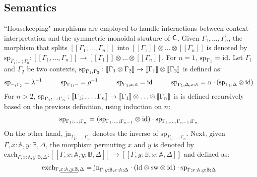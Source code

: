 \subsection{Semantics}

``Housekeeping" morphisms are employed to handle interactions between context interpretation and the symmetric monoidal struture of $\mathsf{C}$. Given $\Gamma_{1}, \ldots, \Gamma_{n}$, the morphism that splits $[\![\Gamma_{1}, \ldots, \Gamma_{n}]\!]$ into $[\![\Gamma_{1}]\!] \otimes \ldots \otimes [\![\Gamma_{n}]\!]  $ is denoted by $\text{sp}_{\Gamma_1;\ldots;\Gamma_n}: [\![\Gamma_{1}, \ldots, \Gamma_{n}]\!] \xrightarrow{} [\![\Gamma_{1}]\!] \otimes \ldots \otimes [\![\Gamma_{n}]\!] $. For $n=1$, $\text{sp}_{\Gamma_1} = \mathrm{id}$.
Let $\Gamma_1$ and $\Gamma_2$ be two contexts, $\text{sp}_{\Gamma_1, \Gamma_2}: \left \llbracket  \Gamma_1\otimes \Gamma_2 \right \rrbracket \rightarrow \left \llbracket \Gamma_1 \right \rrbracket\otimes \left \llbracket \Gamma_2 \right \rrbracket$ is defined as:
\begin{equation*}
  \text{sp}_{-; \Gamma_2} = \lambda^{-1} \hspace{1cm} \text{sp}_{\Gamma_1; -} = \rho^{-1} \hspace{1cm} \text{sp}_{\Gamma_1;x:\mathbb{A}} = \mathrm{id} \hspace{1cm} \text{sp}_{\Gamma_1; \Delta, x: \mathbb{A}} = \alpha \cdot (\text{sp}_{\Gamma_1; \Delta} \otimes \mathrm{id})
\end{equation*}
For $n>2$, $\text{sp}_{\Gamma_1;\ldots;\Gamma_n}: \left \llbracket \Gamma_1;\ldots;\Gamma_n \right \rrbracket \to \left \llbracket \Gamma_1 \right \rrbracket \otimes \ldots \otimes \left \llbracket \Gamma_n \right \rrbracket $ is is defined recursively based on the previous definition, using induction on $n$:
\begin{equation*}
  \text{sp}_{\Gamma_1;\ldots;\Gamma_n} = (\text{sp}_{\Gamma_1;\ldots;\Gamma_{n-1}} \otimes \mathrm{id} )\cdot \text{sp}_{\Gamma_1, \ldots, \Gamma_{n-1} ;\Gamma_n}
\end{equation*}
On the other hand, $\text{jn}_{\Gamma_1;\ldots;\Gamma_n}$ denotes the inverse of $\text{sp}_{\Gamma_1;\ldots;\Gamma_n}$. Next, given $\Gamma, x : \mathbb{A}, y : \mathbb{B},\Delta$, the morphism permuting $x$ and $y$ is denoted by $\text{exch}_{\Gamma, x : \mathbb{A}, y : \mathbb{B},\Delta}: [\![\Gamma,\underline{ x : \mathbb{A}, y : \mathbb{B}},\Delta]\!] \xrightarrow{} [\![\Gamma, y : \mathbb{B}, x : \mathbb{A}, \Delta]\!] $ and defined as:
\begin{equation*}
  \text{exch}_{\Gamma, \underline{ x : \mathbb{A}, y : \mathbb{B}},\Delta} = \text{jn}_{\Gamma; y:\mathbb{B}, x:\mathbb{A};\Delta} \cdot (\mathrm{id} \otimes \text{sw} \otimes \mathrm{id} ) \cdot \text{sp}_{\Gamma; x:\mathbb{A}, y:\mathbb{B};\Delta}
\end{equation*} 


